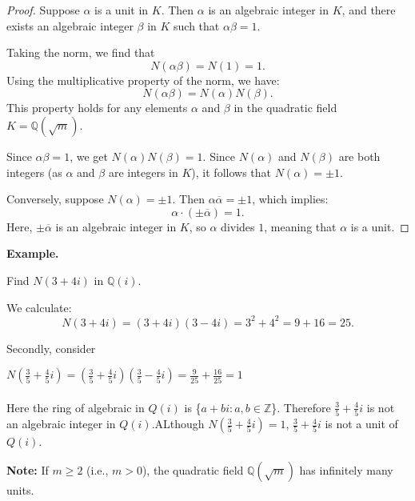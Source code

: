 \documentclass{article}
\newenvironment{example}{%
    \par
    \vspace{5pt}
	\begin{minipage}{\textwidth}
		\noindent\textbf{Example.}
		\tcolorbox[blanker,breakable,left=5mm,parbox=false,
	    before upper={\parindent15pt},
	    after skip=10pt,
		borderline west={1mm}{0pt}{cyan!10!white}]
}{%
		\endtcolorbox
	\end{minipage}
    \vspace{5pt}
}
\begin{document}
\begin{proof}
    Suppose \( \alpha \) is a unit in \( K \). Then \( \alpha \) is an algebraic integer in \( K \), and there exists an algebraic integer \( \beta \) in \( K \) such that \( \alpha \beta = 1 \).

    Taking the norm, we find that
    \[
    N(\alpha \beta) = N(1) = 1.
    \]
    Using the multiplicative property of the norm, we have:
    \[
    N(\alpha \beta) = N(\alpha) N(\beta).
    \]
    This property holds for any elements \( \alpha \) and \( \beta \) in the quadratic field \( K = \mathbb{Q}(\sqrt{m}) \).

    Since \( \alpha \beta = 1 \), we get \( N(\alpha) N(\beta) = 1 \). Since \( N(\alpha) \) and \( N(\beta) \) are both integers (as \( \alpha \) and \( \beta \) are integers in \( K \)), it follows that \( N(\alpha) = \pm 1 \).

    Conversely, suppose \( N(\alpha) = \pm 1 \). Then \( \alpha \overline{\alpha} = \pm 1 \), which implies:
    \[
    \alpha \cdot (\pm \overline{\alpha}) = 1.
    \]
    Here, \( \pm \overline{\alpha} \) is an algebraic integer in \( K \), so \( \alpha \) divides \( 1 \), meaning that \( \alpha \) is a unit.
\end{proof}

\begin{example}
    Find \( N(3 + 4i) \) in \( \mathbb{Q}(i) \).
    
    We calculate:
    \[
    N(3 + 4i) = (3 + 4i)(3 - 4i) = 3^2 + 4^2 = 9 + 16 = 25.
    \]
   
    Secondly, consider

    $N(\frac{3}{5} + \frac{4}{5}i) = (\frac{3}{5} + \frac{4}{5}i)(\frac{3}{5} - \frac{4}{5}i) = \frac{9}{25} + \frac{16}{25} = 1$\\\\
    Here the ring of algebraic in $Q(i)$ is \{$a + bi : a, b \in \mathbb{Z}$\}. Therefore 
    $\frac{3}{5} + \frac{4}{5}i$ is not an algebraic integer in $Q(i)$.ALthough $N(\frac{3}{5} + \frac{4}{5}i) = 1$, 
    $\frac{3}{5} + \frac{4}{5}i$ is not a unit of $Q(i)$.

\end{example}

\noindent \textbf{Note:} If \( m \geq 2 \) (i.e., \( m > 0 \)), the quadratic field \( \mathbb{Q}(\sqrt{m}) \) has infinitely many units.
\end{document}
